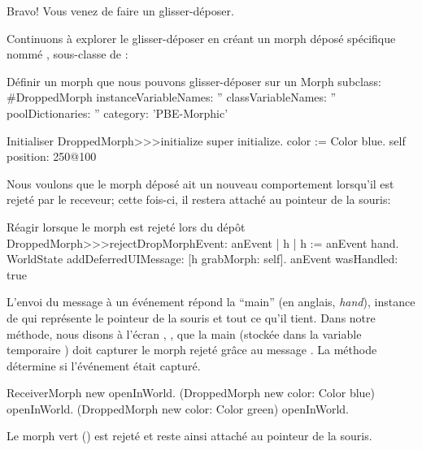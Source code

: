 \documentclass[a4paper,10pt,twoside]{book}
\begin{document}

Bravo! Vous venez de faire un glisser-d\'eposer.

Continuons \`a explorer le glisser-d\'eposer en cr\'eant un morph
d\'epos\'e sp\'ecifique nomm\'e ,
sous-classe de :

\begin{classdef}{D\'efinir un morph que nous pouvons glisser-d\'eposer sur un }
Morph subclass: #DroppedMorph
	instanceVariableNames: ''
	classVariableNames: ''
	poolDictionaries: ''
	category: 'PBE-Morphic'
\end{classdef}

\begin{method}{Initialiser }
DroppedMorph>>>initialize
	super initialize.
	color := Color blue.
	self position: 250@100
\end{method}

Nous voulons que le morph d\'epos\'e ait un nouveau comportement 
lorsqu'il est rejet\'e par le receveur; cette fois-ci, il restera
attach\'e au pointeur de la souris:
\begin{method}{R\'eagir lorsque le morph est rejet\'e lors du d\'ep\^ot}
DroppedMorph>>>rejectDropMorphEvent: anEvent
	| h |
	h := anEvent hand.
	WorldState
		addDeferredUIMessage: [h grabMorph: self].
	anEvent wasHandled: true
\end{method}

L'envoi du message  \`a un \'ev\'enement
r\'epond la ``main'' (en anglais, \emph{hand}), instance de
 qui repr\'esente le pointeur de la souris et tout ce
qu'il tient.
Dans notre m\'ethode, nous disons \`a l'\'ecran \pharo, , que
la main 
(stock\'ee dans la variable temporaire ) doit capturer
le morph rejet\'e 
 gr\^ace au message .
La m\'ethode  d\'etermine si l'\'ev\'enement \'etait captur\'e.

\begin{code}{}
ReceiverMorph new openInWorld.
(DroppedMorph new color: Color blue) openInWorld.
(DroppedMorph new color: Color green) openInWorld.
\end{code}
\noindent
Le morph vert () est rejet\'e et reste ainsi attach\'e
au pointeur de la souris.
\end{document}
